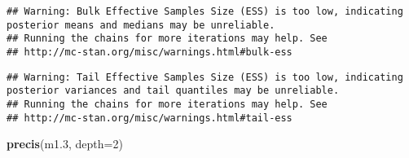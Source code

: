 \documentclass[
]{article}
\newenvironment{Shaded}{\begin{snugshade}}{\end{snugshade}}
\newcommand{\DataTypeTok}[1]{\textcolor[rgb]{0.13,0.29,0.53}{#1}}
\newcommand{\DecValTok}[1]{\textcolor[rgb]{0.00,0.00,0.81}{#1}}
\newcommand{\FloatTok}[1]{\textcolor[rgb]{0.00,0.00,0.81}{#1}}
\newcommand{\KeywordTok}[1]{\textcolor[rgb]{0.13,0.29,0.53}{\textbf{#1}}}
\newcommand{\NormalTok}[1]{#1}
\begin{document}
\begin{verbatim}
## Warning: Bulk Effective Samples Size (ESS) is too low, indicating posterior means and medians may be unreliable.
## Running the chains for more iterations may help. See
## http://mc-stan.org/misc/warnings.html#bulk-ess
\end{verbatim}

\begin{verbatim}
## Warning: Tail Effective Samples Size (ESS) is too low, indicating posterior variances and tail quantiles may be unreliable.
## Running the chains for more iterations may help. See
## http://mc-stan.org/misc/warnings.html#tail-ess
\end{verbatim}

\begin{Shaded}
\begin{Highlighting}[]
\KeywordTok{precis}\NormalTok{(m1}\FloatTok{.3}\NormalTok{,  }\DataTypeTok{depth=}\DecValTok{2}\NormalTok{)}
\end{Highlighting}
\end{Shaded}
\end{document}

